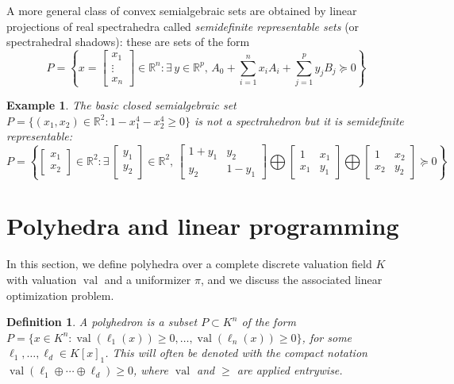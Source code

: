\documentclass[a4paper,12pt]{article}
\newtheorem{definition}[theorem]{Definition}
\newtheorem{example}[theorem]{Example}
\newcommand{\R}{\mathbb{R}} %
\DeclareMathOperator{\val}{val}
\begin{document}
A more general class of convex semialgebraic sets are obtained by linear projections of real spectrahedra
called {\it semidefinite representable sets} (or spectrahedral shadows): these are sets of the form
$$
P = \left\{x = \left[\begin{smallmatrix} x_1 \\ \vdots \\ x_n \end{smallmatrix}\right] \in \R^n : \exists\,y\in\R^p, \, A_0 + \sum_{i=1}^n x_i A_i + \sum_{j=1}^p y_j B_j \succeq 0\right\}
$$

\begin{example}
\label{fermat_quartic}
The basic closed semialgebraic set $P = \{(x_1,x_2) \in \R^2 : 1-x_1^4-x_2^4 \geq 0\}$ is not a spectrahedron
but it is semidefinite representable:
$$
P = \left\{\begin{bmatrix} x_1 \\ x_2 \end{bmatrix} \in \R^2 :
\exists\,
\begin{bmatrix} y_1 \\ y_2 \end{bmatrix} \in \R^2, \,
\begin{bmatrix}
  1+y_1 & y_2 \\
  y_2 & 1-y_1
\end{bmatrix}
\bigoplus
\begin{bmatrix}
  1 & x_1 \\
  x_1 & y_1
\end{bmatrix}
\bigoplus
\begin{bmatrix}
  1 & x_2 \\
  x_2 & y_2
\end{bmatrix}
\succeq 0
\right\}
$$
\end{example}


\section{Polyhedra and linear programming}


In this section, we define polyhedra over a complete discrete valuation field $K$ with valuation $\val$ and a uniformizer $\pi$,
and we discuss the associated linear optimization problem.

\begin{definition}
  A {\it polyhedron} is a subset $P \subset K^n$ of the form
  $P = \{x \in K^n : \val(\ell_1(x))\geq0,\ldots,\val(\ell_n(x))\geq 0\}$,
  for some $\ell_1,\ldots,\ell_d \in K[x]_1$. This will often be denoted with
  the compact notation $\val(\ell_1 \oplus \cdots \oplus \ell_d) \geq 0$, where $\val$
  and $\geq$ are applied entrywise.
\end{definition}
\end{document}
